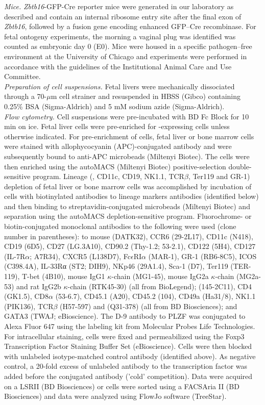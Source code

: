 \textit{Mice.}
\textit{Zbtb16}-GFP-Cre reporter mice were generated in our laboratory as described and contain an internal ribosome entry site after the final exon of \textit{Zbtb16}, followed by a fusion gene encoding enhanced GFP–Cre recombinase\cite{constantinides2014}. For fetal ontogeny experiments, the morning a vaginal plug was identified was counted as embryonic day 0 (E0). Mice were housed in a specific pathogen–free environment at the University of Chicago and experiments were performed in accordance with the guidelines of the Institutional Animal Care and Use Committee.
\\
\textit{Preparation of cell suspensions.}
Fetal livers were mechanically dissociated through a 70-$\mu$m cell strainer and resuspended in HBSS (Gibco) containing 0.25\% BSA (Sigma-Aldrich) and 5 mM sodium azide (Sigma-Aldrich).
\\
\textit{Flow cytometry.}
Cell suspensions were pre-incubated with BD Fc Block for 10 min on ice. Fetal liver cells were pre-enriched for \ab-expressing cells unless otherwise indicated. For pre-enrichment of \ab\UP cells, fetal liver or bone marrow cells were stained with allophycocyanin (APC)-conjugated antibody and were subsequently bound to anti-APC microbeads (Miltenyi Biotec). The cells were then enriched using the autoMACS (Miltenyi Biotec) positive-selection double-sensitive program. Lineage (\CDte, CD11c, CD19, NK1.1, TCR$\beta$, Ter119 and GR-1) depletion of fetal liver or bone marrow cells was accomplished by incubation of cells with biotinylated antibodies to lineage markers antibodies (identified below) and then binding to streptavidin-conjugated microbeads (Miltenyi Biotec) and separation using the autoMACS depletion-sensitive program. Fluorochrome- or biotin-conjugated monoclonal antibodies to the following were used (clone number in parentheses): to mouse \ab (DATK32), CCR6 (29-2L17), CD11c (N418), CD19 (6D5), CD27 (LG.3A10), CD90.2 (Thy-1.2; 53-2.1), CD122 (5H4), CD127 (IL-7R$\alpha$; A7R34), CXCR5 (L138D7), Fc$\epsilon$RI$\alpha$ (MAR-1), GR-1 (RB6-8C5), ICOS (C398.4A), IL-33Rα (ST2; DIH9), NKp46 (29A1.4), Sca-1 (D7), Ter119 (TER-119), T-bet (4B10), mouse IgG1 $\kappa$-chain (MG1-45), mouse IgG2a $\kappa$-chain (MG2a-53) and rat IgG2b $\kappa$-chain (RTK45-30) (all from BioLegend); \CDte (145-2C11), CD4 (GK1.5), CD8$\alpha$ (53-6.7), CD45.1 (A20), CD45.2 (104), CD49a (Ha31/8), NK1.1 (PIK136), TCR$\beta$ (H57-597) and \RORgt (Q31-378) (all from BD Biosciences); and GATA3 (TWAJ; eBioscience). The D-9 antibody to PLZF was conjugated to Alexa Fluor 647 using the labeling kit from Molecular Probes Life Technologies. For intracellular staining, cells were fixed and permeabilized using the Foxp3 Transcription Factor Staining Buffer Set (eBioscience). Cells were then blocked with unlabeled isotype-matched control antibody (identified above). As negative control, a 20-fold excess of unlabeled antibody to the transcription factor was added before the conjugated antibody ('cold' competition). Data were acquired on a LSRII (BD Biosciences) or cells were sorted using a FACSAria II (BD Biosciences) and data were analyzed using FlowJo software (TreeStar).
